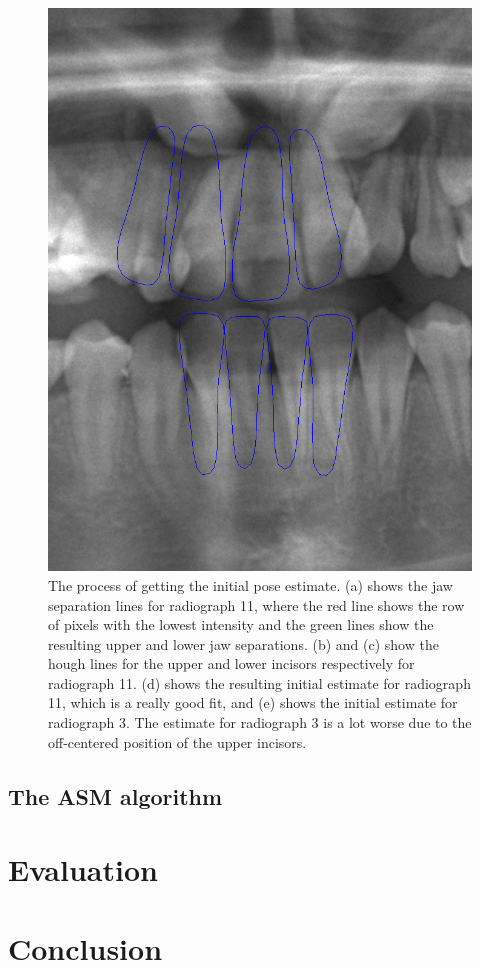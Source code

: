 \documentclass[a4paper,titlepage,12pt]{article}
\begin{document}
\begin{figure}
\begin{minipage}[b]{0.32\linewidth}
	\end{minipage}
	\begin{minipage}[b]{0.32\linewidth}
		\includegraphics[width=\linewidth]{init/initial6.png}
	\end{minipage}
  \caption{
		The process of getting the initial pose estimate. (a) shows the jaw separation lines for radiograph 11, where the red line shows the row of pixels with the lowest intensity and the green lines show the resulting upper and lower jaw separations.
		(b) and (c) show the hough lines for the upper and lower incisors respectively for radiograph 11.
		(d) shows the resulting initial estimate for radiograph 11, which is a really good fit, and (e) shows the initial estimate for radiograph 3.
		The estimate for radiograph 3 is a lot worse due to the off-centered position of the upper incisors.} \label{init}
\end{figure}

\subsection{The ASM algorithm}

\section{Evaluation}


\section{Conclusion}




\end{document}

